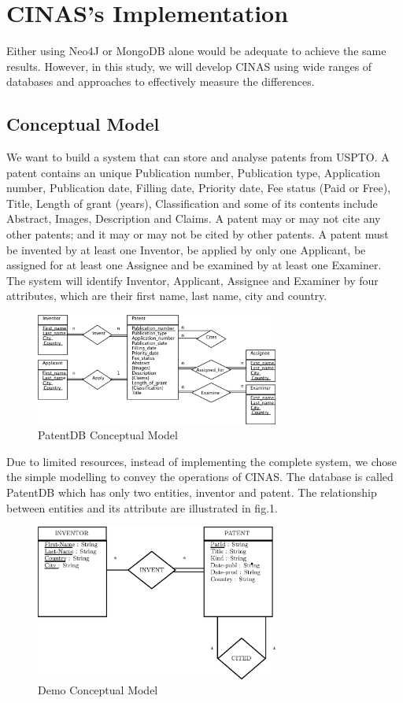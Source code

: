 \documentclass{sig-alternate}
\begin{document}
{\section{CINAS's Implementation }

Either using Neo4J or MongoDB alone would be adequate to achieve the same results. However, in this study, we will develop CINAS using wide ranges of databases and approaches to effectively measure the differences.
\subsection{Conceptual Model}
We want to build a system that can store and analyse patents from USPTO. A patent contains an unique Publication number, Publication type, Application number, Publication date, Filling date, Priority date, Fee status (Paid or Free), Title, Length of grant (years), Classification and some of its contents include Abstract, Images, Description and Claims. A patent may or may not cite any other patents; and it may or may not be cited by other patents. A patent must be invented by at least one Inventor, be applied by only one Applicant, be assigned for at least one Assignee and be examined by at least one Examiner. The system will identify Inventor, Applicant, Assignee and Examiner by four attributes, which are their first name, last name, city and country.

\begin{figure}[htb]
\centering
\includegraphics[width=80mm,scale=10]{erd.png}
\caption{ PatentDB Conceptual Model}
\end{figure}

Due to limited resources, instead of implementing the complete system, we chose the simple modelling to convey the operations of CINAS. The database is called PatentDB which has only two entities, inventor and patent. The relationship between entities and its attribute are illustrated in fig.1. 

\begin{figure}[htb]
\centering
\includegraphics[width=80mm,scale=10]{conceptual_model.eps}
\caption{ Demo Conceptual Model}
\end{figure}

}
\end{document}
